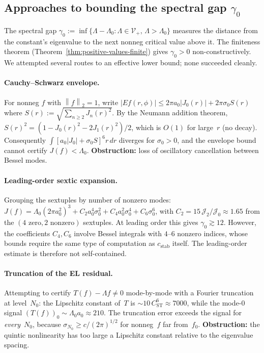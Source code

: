 \documentclass[12pt]{article}
\theoremstyle{definition}
\theoremstyle{remark}
\newcommand{\norm}[1]{\left\|#1\right\|}
\begin{document}
\subsection{Approaches to bounding the spectral gap $\gamma_0$}

The spectral gap $\gamma_0:=\inf\{\Lambda-\Lambda_0:\Lambda\in
\mathcal V_+,\,\Lambda>\Lambda_0\}$ measures the distance from the
constant's eigenvalue to the next nonneg critical value above it.
The finiteness theorem (Theorem~\ref{thm:positive-values-finite})
gives $\gamma_0>0$ non-constructively.  We attempted several routes
to an effective lower bound; none succeeded cleanly.

\paragraph{Cauchy--Schwarz envelope.}
For nonneg $f$ with $\norm{f}_2=1$, write
$|Ef(r,\phi)|\leq 2\pi a_0|J_0(r)|+2\pi\sigma_0 S(r)$
where $S(r):=\sqrt{\sum_{n\geq 2}J_n(r)^2}$.
By the Neumann addition theorem,
$S(r)^2=(1-J_0(r)^2-2J_1(r)^2)/2$, which is $O(1)$ for large~$r$
(no decay).  Consequently $\int[a_0|J_0|+\sigma_0 S]^6 r\,dr$ diverges
for $\sigma_0>0$, and the envelope bound cannot certify
$J(f)<\Lambda_0$.  \textbf{Obstruction:} loss of oscillatory
cancellation between Bessel modes.

\paragraph{Leading-order sextic expansion.}
Grouping the sextuples by number of nonzero modes:
$J(f)=\Lambda_0(2\pi a_0^2)^3+C_2 a_0^4\sigma_0^2+C_4 a_0^2\sigma_0^4
+C_6\sigma_0^6$,
with $C_2=15\,\mathcal J_2/\mathcal J_0\approx 1.65$ from the
$(4\text{ zero},2\text{ nonzero})$ sextuples.  At leading order
this gives $\gamma_0\gtrsim 12$.  However, the coefficients $C_4,C_6$
involve Bessel integrals with $4$--$6$ nonzero indices, whose bounds
require the same type of computation as $c_{\mathrm{stab}}$ itself.
The leading-order estimate is therefore not self-contained.

\paragraph{Truncation of the EL residual.}
Attempting to certify $T(f)-\Lambda f\neq 0$ mode-by-mode with a
Fourier truncation at level~$N_0$: the Lipschitz constant of~$T$ is
$\sim 10\,C_{\mathrm{ST}}^6\approx 7000$, while the mode-$0$ signal
$(T(f))_0\sim\Lambda_0 a_0\approx 210$.  The truncation error exceeds
the signal for \emph{every}~$N_0$, because $\sigma_{N_0}\geq
c/(2\pi)^{1/2}$ for nonneg~$f$ far from~$f_0$.  \textbf{Obstruction:}
the quintic nonlinearity has too large a Lipschitz constant relative
to the eigenvalue spacing.
\end{document}
